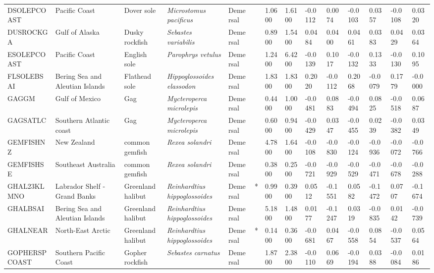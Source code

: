 \begin{longtable}{p{2.6cm}p{1.9cm}p{1.7cm}p{1.6cm}p{1cm}p{0.3cm}p{1cm}p{1cm}p{1cm}p{1.1cm}p{1cm}p{1.1cm}p{1cm}p{1.1cm}}
  DSOLEPCOAST & Pacific Coast & Dover sole & \textit{Microstomus pacificus} & Demersal &   & 1.0600 & 1.6100 & -0.0112 & 0.0074 & -0.0103 & 0.0357 & -0.0108 & 0.0320 \\ 
  DUSROCKGA & Gulf of Alaska & Dusky rockfish & \textit{Sebastes variabilis} & Demersal &   & 0.8900 & 1.5400 & 0.0484 & 0.0400 & 0.0461 & 0.0383 & 0.0429 & 0.0364 \\ 
  ESOLEPCOAST & Pacific Coast & English sole & \textit{Parophrys vetulus} & Demersal &   & 1.2400 & 6.4200 & -0.0139 & 0.1017 & -0.0132 & 0.1333 & -0.0130 & 0.1095 \\ 
  FLSOLEBSAI & Bering Sea and Aleutian Islands & Flathead sole & \textit{Hippoglossoides elassodon} & Demersal &   & 1.8300 & 1.8300 & 0.2020 & -0.0112 & 0.2068 & -0.0079 & 0.1779 & -0.0000 \\ 
  GAGGM & Gulf of Mexico & Gag & \textit{Mycteroperca microlepis} & Demersal &   & 0.4400 & 1.0000 & -0.0481 & 0.0883 & -0.0494 & 0.0825 & -0.0518 & 0.0687 \\ 
  GAGSATLC & Southern Atlantic coast & Gag & \textit{Mycteroperca microlepis} & Demersal &   & 0.6000 & 0.9400 & -0.0429 & 0.0347 & -0.0455 & 0.0239 & -0.0382 & 0.0349 \\ 
  GEMFISHNZ & New Zealand & common gemfish & \textit{Rexea solandri} & Demersal &   & 4.7800 & 1.6400 & -0.0108 & -0.0830 & -0.0124 & -0.0936 & -0.0072 & -0.0766 \\ 
  GEMFISHSE & Southeast Australia & common gemfish & \textit{Rexea solandri} & Demersal &   & 0.3800 & 0.2500 & -0.0721 & -0.0929 & -0.0529 & -0.0471 & -0.0678 & -0.0288 \\ 
  GHAL23KLMNO & Labrador Shelf - Grand Banks & Greenland halibut & \textit{Reinhardtius hippoglossoides} & Demersal & * & 0.9900 & 0.3900 & 0.0512 & -0.1551 & 0.0582 & -0.1472 & 0.0707 & -0.1674 \\ 
  GHALBSAI & Bering Sea and Aleutian Islands & Greenland halibut & \textit{Reinhardtius hippoglossoides} & Demersal &   & 5.1800 & 1.4800 & 0.0177 & -0.1247 & 0.0319 & -0.0835 & 0.0142 & -0.0739 \\ 
  GHALNEAR & North-East Arctic & Greenland halibut & \textit{Reinhardtius hippoglossoides} & Demersal & * & 0.1400 & 0.3600 & -0.0681 & 0.0467 & -0.0558 & 0.0854 & -0.0537 & 0.0564 \\ 
  GOPHERSPCOAST & Southern Pacific Coast & Gopher rockfish & \textit{Sebastes carnatus} & Demersal &   & 1.8700 & 2.3800 & -0.0110 & 0.0669 & -0.0194 & 0.0388 & -0.0084 & 0.0186 \\ 

\end{longtable}
